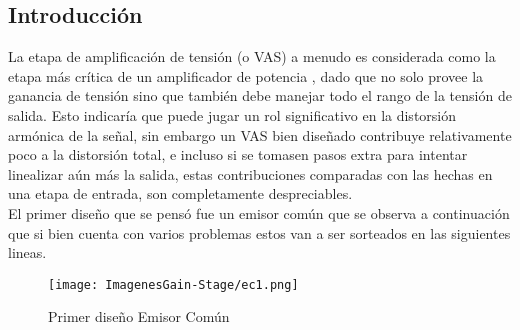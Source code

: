 



\subsection{Introducción}
La etapa de amplificación de tensión (o VAS) a menudo es considerada como la etapa más crítica de un amplificador de potencia , dado que no solo provee la ganancia de tensión sino que también debe manejar todo el rango de la tensión de salida. Esto indicaría que puede jugar un rol significativo en la distorsión armónica de la señal, sin embargo un VAS bien diseñado contribuye relativamente poco a la distorsión total, e incluso si se tomasen pasos extra para intentar linealizar aún más la salida, estas contribuciones comparadas con las hechas en una etapa de entrada, son completamente despreciables.\\

El primer diseño que se pensó fue un emisor común que se observa a continuación que si bien  cuenta con varios problemas estos van  a ser sorteados en las siguientes lineas.
\begin{figure}[H]
\centering
	\texttt{[image: ImagenesGain-Stage/ec1.png]}
	\caption{Primer diseño Emisor Común}
	\label{fig:ec1}
\end{figure}

